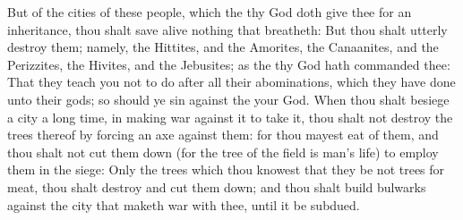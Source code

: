 \begin{biblechapter}
\verse But of the cities of these people, which the \LORD thy God doth give thee for an inheritance, thou shalt save alive nothing that breatheth:
\verse But thou shalt utterly destroy them; namely, the Hittites, and the Amorites, the Canaanites, and the Perizzites, the Hivites, and the Jebusites; as the \LORD thy God hath commanded thee:
\verse That they teach you not to do after all their abominations, which they have done unto their gods; so should ye sin against the \LORD your God.
\verse When thou shalt besiege a city a long time, in making war against it to take it, thou shalt not destroy the trees thereof by forcing an axe against them: for thou mayest eat of them, and thou shalt not cut them down (for the tree of the field is man's life) to employ them in the siege:
\verse Only the trees which thou knowest that they be not trees for meat, thou shalt destroy and cut them down; and thou shalt build bulwarks against the city that maketh war with thee, until it be subdued.
\end{biblechapter}

